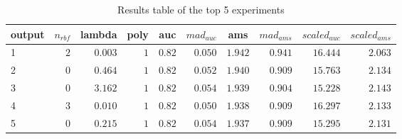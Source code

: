 \begin{table}[!tbp]
\caption{Results table of the top 5 experiments\label{table:results}} 
\begin{center}
\begin{tabular}{lrrrrrrrrr}
\hline\hline
\multicolumn{1}{l}{output}&\multicolumn{1}{c}{$n_{rbf}$}&\multicolumn{1}{c}{lambda}&\multicolumn{1}{c}{poly}&\multicolumn{1}{c}{auc}&\multicolumn{1}{c}{$mad_{auc}$}&\multicolumn{1}{c}{ams}&\multicolumn{1}{c}{$mad_{ams}$}&\multicolumn{1}{c}{$scaled_{auc}$}&\multicolumn{1}{c}{$scaled_{ams}$}\tabularnewline
\hline
1&$2$&$0.003$&$1$&$0.82$&$0.050$&$1.942$&$0.941$&$16.444$&$2.063$\tabularnewline
2&$0$&$0.464$&$1$&$0.82$&$0.052$&$1.940$&$0.909$&$15.763$&$2.134$\tabularnewline
3&$0$&$3.162$&$1$&$0.82$&$0.054$&$1.939$&$0.904$&$15.228$&$2.143$\tabularnewline
4&$3$&$0.010$&$1$&$0.82$&$0.050$&$1.938$&$0.909$&$16.297$&$2.133$\tabularnewline
5&$0$&$0.215$&$1$&$0.82$&$0.054$&$1.937$&$0.909$&$15.295$&$2.131$\tabularnewline
\hline
\end{tabular}\end{center}
\end{table}
